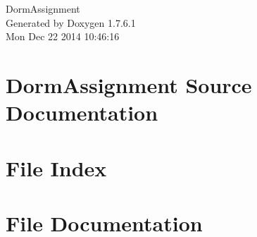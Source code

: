 \documentclass[a4paper]{book}
\begin{document}
\hypersetup{pageanchor=false,citecolor=blue}
\begin{titlepage}
\vspace*{7cm}
\begin{center}
{\Large \-Dorm\-Assignment }\\
\vspace*{1cm}
{\large \-Generated by Doxygen 1.7.6.1}\\
\vspace*{0.5cm}
{\small Mon Dec 22 2014 10:46:16}\\
\end{center}
\end{titlepage}
\clearemptydoublepage
{}
\tableofcontents
\clearemptydoublepage
{}
\hypersetup{pageanchor=true,citecolor=blue}
\chapter{\-Dorm\-Assignment \-Source \-Documentation}
\label{index}\hypertarget{index}{}
\chapter{\-File \-Index}

\chapter{\-File \-Documentation}




























































\printindex
\end{document}
